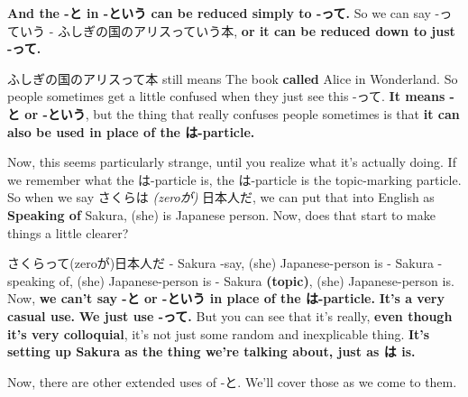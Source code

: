 {\bf And the -と in -という can be reduced simply to -って.} So we can say -っていう - ふしぎの国のアリスっていう本, {\bf or it can be reduced down to just -って.}

{}

ふしぎの国のアリスって本 still means The book {\bf called} Alice in Wonderland. So people sometimes get a little confused when they just see this -って. {\bf It means -と or -という}, but the thing that really confuses people sometimes is that {\bf it can also be used in place of the は-particle.}

\stopsectionlevel

\startsectionlevel[title={って used in place of は},reference={って-used-in-place-of-は}]

Now, this seems particularly strange, until you realize what it's actually doing. If we remember what the は-particle is, the は-particle is the topic-marking particle. So when we say さくらは {\em (zeroが)} 日本人だ, we can put that into English as {\bf Speaking of} Sakura, (she) is Japanese person. Now, does that start to make things a little clearer?

{}

さくらって(zeroが)日本人だ - Sakura -say, (she) Japanese-person is - Sakura -speaking of, (she) Japanese-person is - Sakura {\bf (topic)}, (she) Japanese-person is. Now, {\bf we can't say -と or -という in place of the は-particle.} {\bf It's a very casual use.} {\bf We just use -って.} But you can see that it's really, {\bf even though it's very colloquial}, it's not just some random and inexplicable thing. {\bf It's setting up Sakura as the thing we're talking about, just as は is.}

Now, there are other extended uses of -と. We'll cover those as we come to them.

\stopsectionlevel

\stopsectionlevel

\stopsectionlevel
